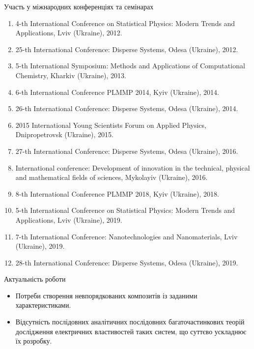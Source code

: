 \documentclass[10pt]{beamer}
\begin{document}
\begin{frame}{Участь у міжнародних конференціях та семінарах}

{\footnotesize
\begin{enumerate}
\item 4-th International Conference on Statistical Physics: Modern Trends and Applications, Lviv (Ukraine), 2012.

\item 25-th International Conference: Disperse Systems, Odesa (Ukraine), 2012.

\item 5-th International Symposium: Methods and Applications of Computational Chemistry,  Kharkiv (Ukraine), 2013.

\item 6-th International Conference PLMMP 2014,  Kyiv (Ukraine), 2014.

\item 26-th International Conference: Disperse Systems,  Odesa (Ukraine), 2014.

\item 2015 International Young Scientists Forum on Applied Physics,  Dnipropetrovsk (Ukraine), 2015.

\item 27-th International Conference: Disperse Systems, Odesa (Ukraine), 2016.

\item International conference: Development of innovation in the technical, physical and mathematical fields of sciences, Mykolayiv (Ukraine), 2016.

\item 8-th International  Conference PLMMP 2018, Kyiv (Ukraine), 2018.

\item 5-th International Conference on Statistical Physics: Modern Trends and Applications, Lviv (Ukraine), 2019.

\item 7-th International Conference: Nano\-technologies and Nanomaterials,  Lviv (Ukraine), 2019.

\item 28-th International Conference: Disperse Systems, Odesa (Ukraine), 2019.
\end{enumerate}
}

\end{frame}


\begin{frame}{Актуальність роботи}

  \begin{itemize}
    \item Потреби створення невпорядкованих композитів із заданими характеристиками.
    \item Відсутність послідовних аналітичних послідовних багаточастинкових теорій дослідження електричних властивостей таких систем, що суттєво ускладнює їх розробку.
  \end{itemize}

\end{frame}
\end{document}
